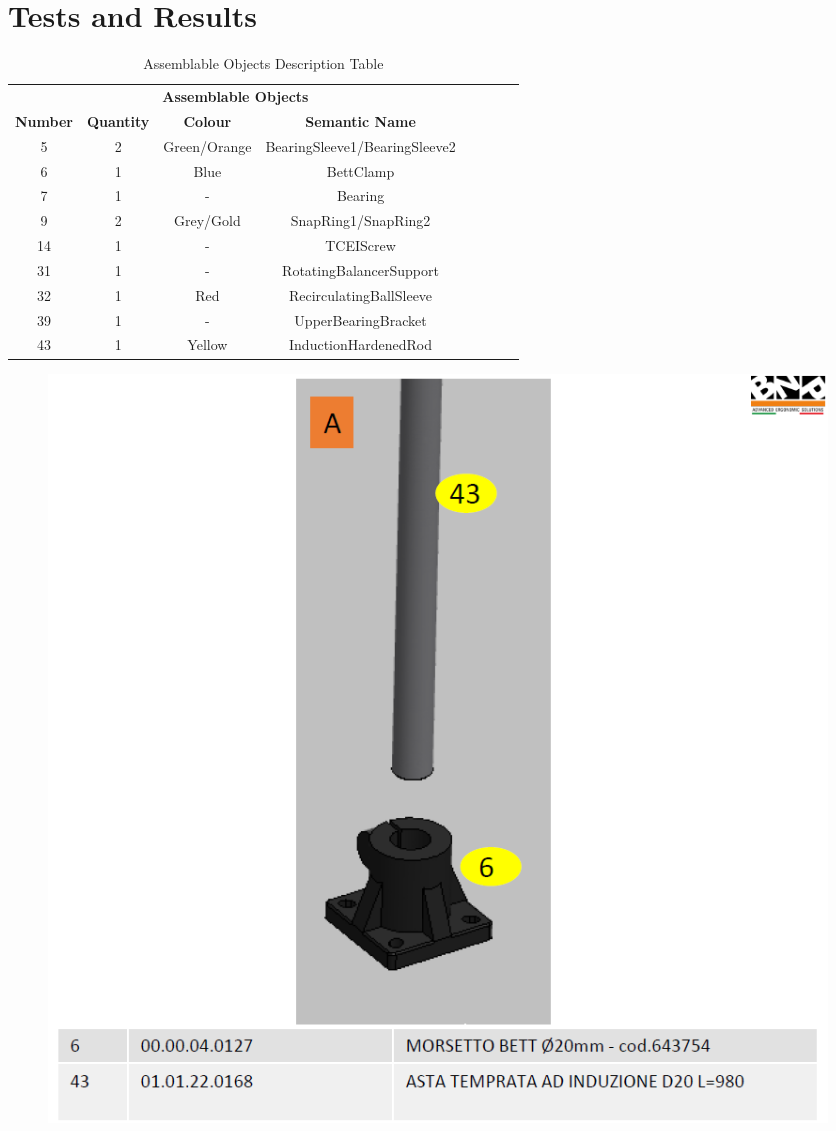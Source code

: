 
\chapter{Tests and Results} \label{cha:test}


\begin{table}[htbp]
  \centering
  \caption{Assemblable Objects Description Table}\label{Approcci}
  \medskip
\begin{tabular}{cccccccc}
\toprule
\multicolumn{4}{c}{\textbf{Assemblable Objects}} \\
\textbf{Number} &  \textbf{Quantity} &  \textbf{Colour} &  \textbf{Semantic Name}  \\
\midrule
\rowcolor{gray!35}
5 & 2 & Green/Orange & BearingSleeve1/BearingSleeve2 \\
6 & 1 & Blue & BettClamp \\
\rowcolor{gray!35}
7 & 1 & - & Bearing \\
9 & 2 & Grey/Gold & SnapRing1/SnapRing2 \\
\rowcolor{gray!35}
14 & 1 & - & TCEIScrew \\
31 & 1 & - & RotatingBalancerSupport \\
\rowcolor{gray!35}
32 & 1 & Red & RecirculatingBallSleeve \\
39 & 1 & - & UpperBearingBracket \\
\rowcolor{gray!35}
43 & 1 & Yellow & InductionHardenedRod \\
\bottomrule
\end{tabular}
\end{table}


\begin{figure} [h]
\centering
\includegraphics[width=1.0
\textwidth]{figures/Magistrale/ass_obj_1}
\caption[BFS Example]{
\label{fig:ass_obj_1}}
\end{figure} 

